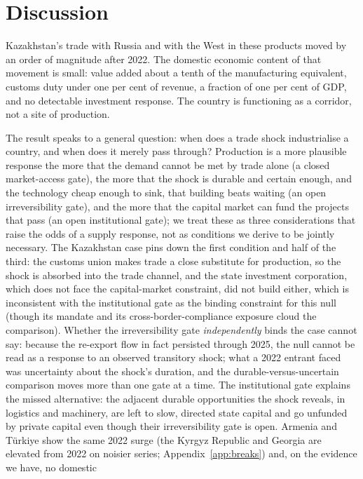 \documentclass[12pt]{article}
\begin{document}
\section{Discussion}\label{sec:discussion}

Kazakhstan's trade with Russia and with the West in these products moved by an order of
magnitude after 2022. The domestic economic content of that movement is small: value added
about a tenth of the manufacturing equivalent, customs duty under one per cent of revenue, a
fraction of one per cent of GDP, and no detectable investment response. The country is
functioning as a corridor, not a site of production.

The result speaks to a general question: when does a trade shock industrialise a country, and
when does it merely pass through? Production is a more plausible response the more that the
demand cannot be met by trade alone (a closed market-access gate), the more that the shock is
durable and certain enough, and the technology cheap enough to sink, that building beats
waiting (an open irreversibility gate), and the more that the capital market can fund the
projects that pass (an open institutional gate); we treat these as three considerations that
raise the odds of a supply response, not as conditions we derive to be jointly necessary. The
Kazakhstan case pins down the first
condition and half of the third: the customs union makes trade a close substitute
for production, so the shock is absorbed into the trade channel, and the state investment
corporation, which does not face the capital-market constraint, did not build either, which
is inconsistent with the institutional gate as the binding constraint for this null (though its mandate
and its cross-border-compliance exposure cloud the comparison). Whether the irreversibility
gate \emph{independently} binds the case cannot say: because the re-export flow in fact
persisted through 2025, the null cannot be read as a response to an observed transitory shock;
what a 2022 entrant faced was uncertainty about the shock's duration, and the
durable-versus-uncertain comparison moves more than one gate at a time. The
institutional gate explains the missed alternative: the adjacent durable opportunities the
shock reveals, in logistics and machinery, are left to slow, directed
state capital and go unfunded by private capital even though their irreversibility gate is
open. Armenia and T\"urkiye show the same 2022 surge (the Kyrgyz Republic and Georgia are
elevated from 2022 on noisier series; Appendix~\ref{app:breaks}) and, on the evidence we have, no domestic
\end{document}
